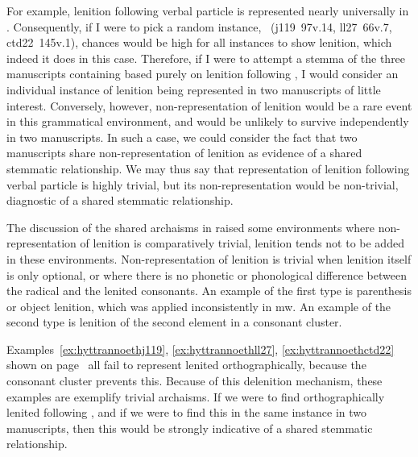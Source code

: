 For example, lenition following verbal particle  is represented nearly universally in . Consequently, if I were to pick a random instance, \eg {}~(\gls{j119}~97v.14, \gls{ll27}~66v.7, \gls{ctd22}~145v.1), chances would be high for all instances to show lenition, which indeed it does in this case. Therefore, if I were to attempt a stemma of the three manuscripts containing  based purely on lenition following , I would consider an individual instance of lenition being represented in two manuscripts of little interest. Conversely, however, non-representation of lenition would be a rare event in this grammatical environment, and would be unlikely to survive independently in two manuscripts. In such a case, we could consider the fact that two manuscripts share non-representation of lenition as evidence of a shared stemmatic relationship. We may thus say that representation of lenition following verbal particle  is highly trivial, but its non-representation would be non-trivial, \ie diagnostic of a shared stemmatic relationship.



The discussion of the shared archaisms in  raised some environments where non-representation of lenition is comparatively trivial, \ie lenition tends not to be added in these environments. Non-representation of lenition is trivial when lenition itself is only optional, or where there is no phonetic or phonological difference between the radical and the lenited consonants. An example of the first type is parenthesis or object lenition, which was applied inconsistently in \gls{mw}. An example of the second type is lenition of the second element in a  consonant cluster.

Examples~\ref{ex:hyttrannoethj119}, \ref{ex:hyttrannoethll27}, \ref{ex:hyttrannoethctd22} shown on page~ all fail to represent lenited  orthographically, because the  consonant cluster prevents this. Because of this delenition mechanism, these examples are exemplify trivial archaisms. If we were to find orthographically lenited  following , and if we were to find this in the same instance in two manuscripts, then this would be strongly indicative of a shared stemmatic relationship.



